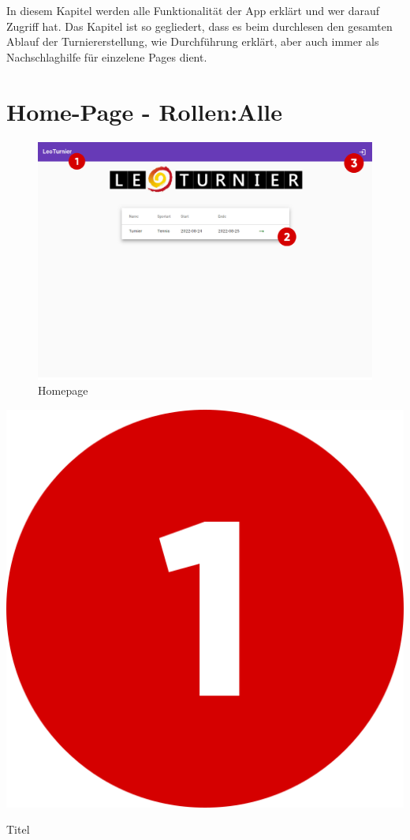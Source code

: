 
In diesem Kapitel werden alle Funktionalität der App erklärt und wer darauf Zugriff hat. Das Kapitel ist so gegliedert, dass es beim durchlesen den gesamten Ablauf der Turniererstellung, wie Durchführung erklärt, aber auch immer als Nachschlaghilfe für einzelene Pages dient.

\section{Home-Page - Rollen:Alle}
\begin{figure}[H]
    \includegraphics[scale=0.4]{pics/user-guide/homepage.png}
    \caption{Homepage}
\end{figure}
\bigskip

\includegraphics[scale=0.05]{pics/user-guide/numbers/number-1.png} \begin{LARGE} Titel \end{LARGE}

